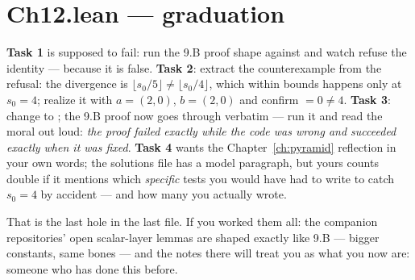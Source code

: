 \section{Ch12.lean --- graduation}

\textbf{Task 1} is supposed to fail: run the 9.B proof shape against
 and watch  refuse the  identity ---
because it is false. \textbf{Task 2}: extract the counterexample from
the refusal: the divergence is $\lfloor s_0/5 \rfloor \neq
\lfloor s_0/4 \rfloor$, which within bounds happens only at $s_0 = 4$;
realize it with $a = (2,0)$, $b = (2,0)$ and confirm
 $= 0 \neq 4$. \textbf{Task 3}: change
 to ; the 9.B proof now goes through
verbatim --- run it and read the moral out loud: \emph{the proof failed
exactly while the code was wrong and succeeded exactly when it was
fixed}. \textbf{Task 4} wants the Chapter~\ref{ch:pyramid} reflection
in your own words; the solutions file has a model paragraph, but yours
counts double if it mentions which \emph{specific} tests you would have
had to write to catch $s_0 = 4$ by accident --- and how many you
actually wrote.

\medskip
\noindent That is the last hole in the last file. If you worked them
all: the companion repositories' open scalar-layer lemmas are shaped
exactly like 9.B --- bigger constants, same bones --- and the
 notes there will treat you as what you now are:
someone who has done this before.
